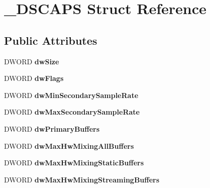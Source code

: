 \hypertarget{struct___d_s_c_a_p_s}{}\section{\+\_\+\+D\+S\+C\+A\+PS Struct Reference}
\label{struct___d_s_c_a_p_s}
\subsection*{Public Attributes}
\begin{DoxyCompactItemize}
\item 
D\+W\+O\+RD {\bfseries dw\+Size}\hypertarget{struct___d_s_c_a_p_s_acf5a8360a23ad3d2eb524d1cba1df331}{}\label{struct___d_s_c_a_p_s_acf5a8360a23ad3d2eb524d1cba1df331}

\item 
D\+W\+O\+RD {\bfseries dw\+Flags}\hypertarget{struct___d_s_c_a_p_s_a06c7cb064cb8ec0e0dacb0757ada8b91}{}\label{struct___d_s_c_a_p_s_a06c7cb064cb8ec0e0dacb0757ada8b91}

\item 
D\+W\+O\+RD {\bfseries dw\+Min\+Secondary\+Sample\+Rate}\hypertarget{struct___d_s_c_a_p_s_aa274d8c589981cf49dea4fcebbeb8398}{}\label{struct___d_s_c_a_p_s_aa274d8c589981cf49dea4fcebbeb8398}

\item 
D\+W\+O\+RD {\bfseries dw\+Max\+Secondary\+Sample\+Rate}\hypertarget{struct___d_s_c_a_p_s_a3ab6dfd8a659338b0d6f871c5bfac77d}{}\label{struct___d_s_c_a_p_s_a3ab6dfd8a659338b0d6f871c5bfac77d}

\item 
D\+W\+O\+RD {\bfseries dw\+Primary\+Buffers}\hypertarget{struct___d_s_c_a_p_s_a2cd5675747f68712d4851795b03b2ee8}{}\label{struct___d_s_c_a_p_s_a2cd5675747f68712d4851795b03b2ee8}

\item 
D\+W\+O\+RD {\bfseries dw\+Max\+Hw\+Mixing\+All\+Buffers}\hypertarget{struct___d_s_c_a_p_s_aa76c898aabb19fb791def4a9e875c074}{}\label{struct___d_s_c_a_p_s_aa76c898aabb19fb791def4a9e875c074}

\item 
D\+W\+O\+RD {\bfseries dw\+Max\+Hw\+Mixing\+Static\+Buffers}\hypertarget{struct___d_s_c_a_p_s_ac7996b0871403cbedeafa3769130d951}{}\label{struct___d_s_c_a_p_s_ac7996b0871403cbedeafa3769130d951}

\item 
D\+W\+O\+RD {\bfseries dw\+Max\+Hw\+Mixing\+Streaming\+Buffers}\hypertarget{struct___d_s_c_a_p_s_a1323003e827ec18c2fd6e8703732be2c}{}\label{struct___d_s_c_a_p_s_a1323003e827ec18c2fd6e8703732be2c}


\end{DoxyCompactItemize}
